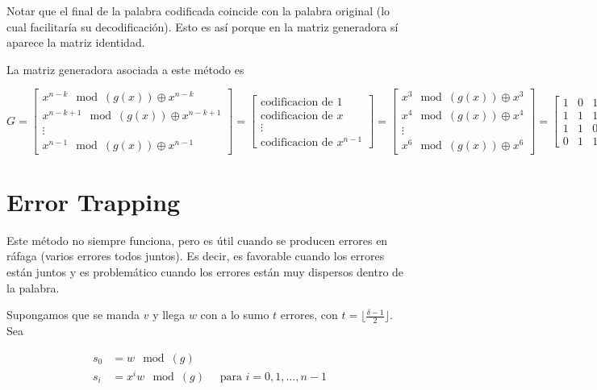 \documentclass[10pt,a4paper]{article}
\begin{document}
Notar que el final de la palabra codificada coincide con la palabra original (lo cual facilitaría su decodificación). Esto es así porque en la matriz generadora sí aparece la matriz identidad.

La matriz generadora asociada a este método es

\begin{center}
$G= \left[ \begin{array}{c} x^{n -k}\mod(g(x)) \oplus x^{n-k}\\ x^{n -k+1}\mod(g(x)) \oplus x^{n-k+1}\\ \vdots\\ x^{n -1}\mod(g(x)) \oplus x^{n-1} \end{array} \right] =\left[ \begin{array}{c} \text{codificacion de } 1\\ \text{codificacion de } x\\ \vdots\\ \text{codificacion de } x^{n-1} \end{array} \right]=\left[ \begin{array}{c} x ^3 \mod(g(x))\oplus x^3\\ x^{4}\mod(g(x)) \oplus x^{4}\\ \vdots\\ x^{6}\mod(g(x)) \oplus x^{6} \end{array} \right] = \left[ \begin{array}{ccc|cccc} 1&0&1&1&0&0&0\\ 1&1&1&0&1&0&0\\ 1&1&0&0&0&1&0\\ 0&1&1&0&0&0&1 \end{array} \right]$
\end{center}

\section*{Error Trapping}

Este método no siempre funciona, pero es útil cuando se producen errores en ráfaga (varios errores todos juntos). Es decir, es favorable cuando los errores están juntos y es problemático cuando los errores están muy dispersos dentro de la palabra.

Supongamos que se manda $v$ y llega $w$ con a lo sumo $t$ errores, con $t = \lfloor \frac{\delta - 1}{2}\rfloor$. Sea

\begin{center}
\begin{align*} s_0 &= w \mod (g)\\ s_i &= x^i w \mod (g)\quad \text{ para } i = 0, 1, \dots, n-1 \end{align*}
\end{center}
\end{document}
